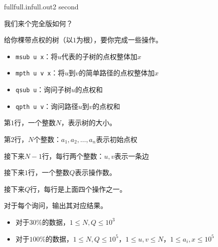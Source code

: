 \documentclass[11pt,a4paper,oneside]{article}
\begin{document}
\begin{problem}{full}{full.in}{full.out}{2 second} 
	
	我们来个完全版如何？
	
	给你棵带点权的树（以$1$为根），要你完成一些操作。
	
	\begin{itemize}
		\item \texttt{msub u x}：将$u$代表的子树的点权整体加$x$
		\item \texttt{mpth u v x}：将$u$到$v$的简单路径的点权整体加$x$
		\item \texttt{qsub u}：询问子树$u$的点权和
		\item \texttt{qpth u v}：询问路径$u$到$v$的点权和
	\end{itemize}
	
	\InputFile
	
	第$1$行，一个整数$N$，表示树的大小。
	
	第$2$行，$N$个整数：$a_1,a_2,\dots,a_n$表示初始点权
	
	接下来$N - 1$行，每行两个整数：$u, v$表示一条边
	
	接下来$1$行，一个整数$Q$表示操作数。
	
	接下来$Q$行，每行是上面四个操作之一。
	
	\OutputFile
	
	对于每个询问，输出其对应结果。
	
	\Example
	
	\begin{example}
\end{example}

\Note

\begin{itemize}
	\item 对于$30\%$的数据，$1 \leq N, Q \leq 10^3$
	\item 对于$100\%$的数据，$1 \leq N, Q \leq 10^5$，$1 \leq u, v \leq N$，$1 \leq a_i, x \leq 10^5$
\end{itemize}

\end{problem}
\end{document}
